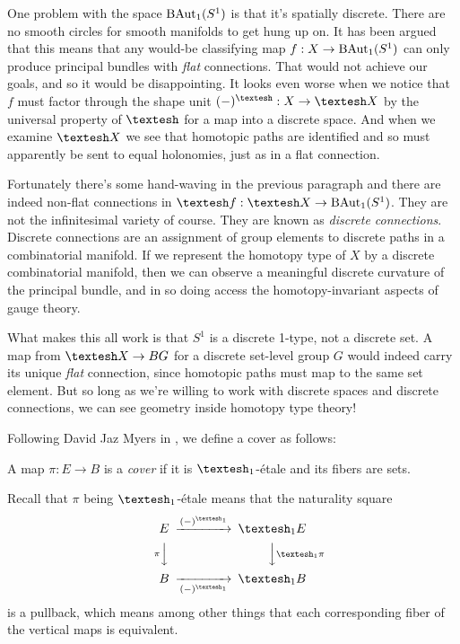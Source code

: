 \documentclass[12pt]{article}
\begin{document}

One problem with the space \( \mathrm{BAut}_1(S^1) \) is that it's spatially discrete. There are no smooth circles for smooth manifolds to get hung up on. It has been argued that this means that any would-be classifying map \( f:X\to \mathrm{BAut}_1(S^1) \) can only produce principal bundles with \emph{flat} connections. That would not achieve our goals, and so it would be disappointing. It looks even worse when we notice that \( f \) must factor through the shape unit \( (-)^\shape:X\to\shape X \) by the universal property of \( \shape \) for a map into a discrete space. And when we examine \( \shape X \) we see that homotopic paths are identified and so must apparently be sent to equal holonomies, just as in a flat connection.

Fortunately there's some hand-waving in the previous paragraph and there are indeed non-flat connections in \( \shape f:\shape X\to \BAutoso \). They are not the infinitesimal variety of course. They are known as \emph{discrete connections}\cite{crane_connections}\cite{crane_ddg}. Discrete connections are an assignment of group elements to discrete paths in a combinatorial manifold. If we represent the homotopy type of \( X \) by a discrete combinatorial manifold, then we can observe a meaningful discrete curvature of the principal bundle, and in so doing access the homotopy-invariant aspects of gauge theory.

What makes this all work is that \( S^1 \) is a discrete 1-type, not a discrete set. A map from \( \shape X\to BG \) for a discrete set-level group \( G \) would indeed carry its unique \emph{flat} connection, since homotopic paths must map to the same set element. But so long as we're willing to work with discrete spaces and discrete connections, we can see geometry inside homotopy type theory!

Following David Jaz Myers in \cite{myersgood}, we define a cover as follows:

\begin{mydef}
  A map \(\pi:E\to B\) is a \emph{cover} if it is \(\shapeo\)-étale and its fibers are sets.
\end{mydef}

Recall that \(\pi\) being \(\shapeo\)-étale means that the naturality square 
\[
\begin{CD}
E @>(-)^{\shapeo}>> \shapeo E \\
@V{\pi}VV @VV{\shapeo \pi}V \\
B @>>(-)^{\shapeo}> \shapeo B
\end{CD}
\]
is a pullback, which means among other things that each corresponding fiber of the vertical maps is equivalent.
\end{document}
